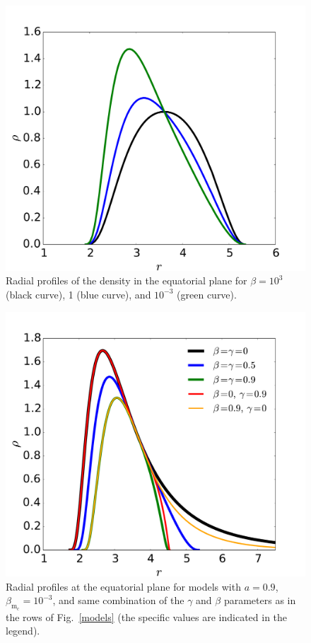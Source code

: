\documentclass[referee]{aa}
\begin{document}
\begin{figure}[t]
\centering
\includegraphics[scale=0.2]{figures/fig4.pdf}
\caption{Radial profiles of the density in the equatorial plane for $\beta=10^3$ (black curve), 1 (blue curve), and $10^{-3}$ (green curve). }
\label{magnetisation-profile}
 \end{figure}
 
\begin{figure}[t]
\centering
\includegraphics[scale=0.2]{figures/fig5.pdf}
\caption{Radial profiles at the equatorial plane for models with $a=0.9$, $\beta_{\mathrm{m}_{\mathrm{c}}}
=10^{-3}$, and same combination of the $\gamma$ and $\beta$ parameters as in the rows of Fig.~\ref{models} (the specific values are indicated in the legend).}
\label{more-profile}
\end{figure}
\end{document}
